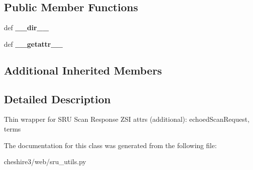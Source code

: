 \subsection*{Public Member Functions}
\begin{DoxyCompactItemize}
\item 
\hypertarget{classcheshire3_1_1web_1_1sru__utils_1_1_scan_response_a54feb1dfba915f1980a78bbee53d2428}{def {\bfseries \-\_\-\-\_\-dir\-\_\-\-\_\-}}\label{classcheshire3_1_1web_1_1sru__utils_1_1_scan_response_a54feb1dfba915f1980a78bbee53d2428}

\item 
\hypertarget{classcheshire3_1_1web_1_1sru__utils_1_1_scan_response_af746d6b063d2f39fc8ede6206e5b3297}{def {\bfseries \-\_\-\-\_\-getattr\-\_\-\-\_\-}}\label{classcheshire3_1_1web_1_1sru__utils_1_1_scan_response_af746d6b063d2f39fc8ede6206e5b3297}

\end{DoxyCompactItemize}
\subsection*{Additional Inherited Members}


\subsection{Detailed Description}
\begin{DoxyVerb}Thin wrapper for SRU Scan Response
ZSI attrs (additional): echoedScanRequest, terms
\end{DoxyVerb}
 

The documentation for this class was generated from the following file\-:\begin{DoxyCompactItemize}
\item 
cheshire3/web/sru\-\_\-utils.\-py\end{DoxyCompactItemize}
